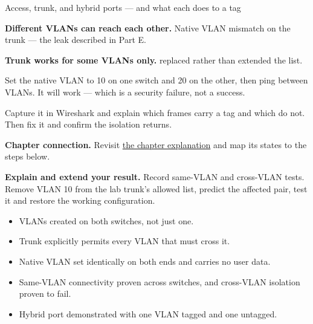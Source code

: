 \begin{labproject}{Access, trunk, and hybrid ports --- and what each does to a tag}
\begin{troubleshoot}
\textbf{Different VLANs can reach each other.} Native VLAN mismatch on the trunk --- the leak described in Part E.

\textbf{Trunk works for some VLANs only.}  replaced rather than extended the list.
\end{troubleshoot}

\begin{tryit}
Set the native VLAN to 10 on one switch and 20 on the other, then ping between VLANs. It will work --- which is a security failure, not a success.

Capture it in Wireshark and explain which frames carry a tag and which do not. Then fix it and confirm the isolation returns.
\end{tryit}
\end{labproject}

\textbf{Chapter connection.} Revisit \hyperref[ch:vlan]{the chapter explanation} and map its states to the steps below.


\begin{verification}
\textbf{Explain and extend your result.} Record same-VLAN and cross-VLAN tests. Remove VLAN 10 from the lab trunk's allowed list, predict the affected pair, test it and restore the working configuration.


\begin{itemize}
  \item VLANs created on both switches, not just one.
  \item Trunk explicitly permits every VLAN that must cross it.
  \item Native VLAN set identically on both ends and carries no user data.
  \item Same-VLAN connectivity proven across switches, and cross-VLAN isolation proven to fail.
  \item Hybrid port demonstrated with one VLAN tagged and one untagged.
\end{itemize}
\end{verification}

